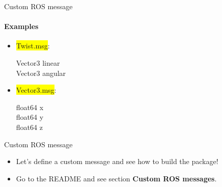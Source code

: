 \documentclass{beamer}
\begin{document}
\begin{frame}{Custom ROS message}
    \framesubtitle{Examples}  
    
    \begin{itemize}
        
                \item {\ttfamily \colorbox{yellow}{Twist.msg}}:
                
                \begin{focus}
                    \ttfamily
                    Vector3  linear\\
                    Vector3  angular
                \end{focus}
                
                
        \item {\ttfamily \colorbox{yellow}{Vector3.msg}}:
        
        \begin{focus}
            \ttfamily
            float64 x\\
            float64 y\\
            float64 z
        \end{focus}
        

    \end{itemize}
    
    
\end{frame}



\begin{frame}{Custom ROS message}
  
    
    \begin{itemize}
        
        \item Let's define a custom message and see how to build the package!
        \vspace{0.7cm}
        \item Go to the README and see section \textbf{Custom ROS messages}.
        
    \end{itemize}
\end{frame}
\end{document}
